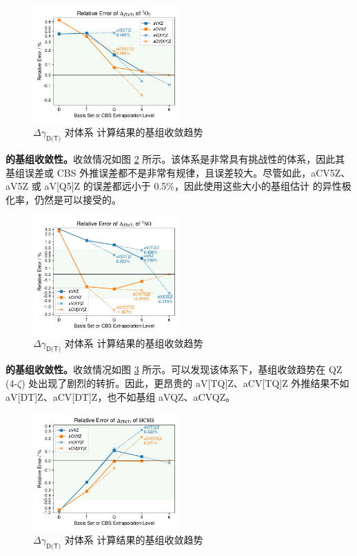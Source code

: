 \begin{figure}[ht]
    \centering
    \caption{$\Delta \gamma_\textsf{D(T)}$ 对体系  计算结果的基组收敛趋势}
    \label{fig.O2-aniso}
    \includegraphics[width=0.5\textwidth]{assets/O2-aniso.pdf}
\end{figure}

\textbf{ 的基组收敛性。}收敛情况如图 \ref{fig.SO-aniso} 所示。该体系是非常具有挑战性的体系，因此其基组误差或 CBS 外推误差都不是非常有规律，且误差较大。尽管如此，aCV5Z、aV5Z 或 aV[Q5]Z 的误差都远小于 0.5\%，因此使用这些大小的基组估计  的异性极化率，仍然是可以接受的。

\begin{figure}[ht]
    \centering
    \caption{$\Delta \gamma_\textsf{D(T)}$ 对体系  计算结果的基组收敛趋势}
    \label{fig.SO-aniso}
    \includegraphics[width=0.5\textwidth]{assets/SO-aniso.pdf}
\end{figure}

\textbf{ 的基组收敛性。}收敛情况如图 \ref{fig.HCHS-aniso} 所示。可以发现该体系下，基组收敛趋势在 QZ (4-$\zeta$) 处出现了剧烈的转折。因此，更昂贵的 aV[TQ]Z、aCV[TQ]Z 外推结果不如 aV[DT]Z、aCV[DT]Z，也不如基组 aVQZ、aCVQZ。

\begin{figure}[ht]
    \centering
    \caption{$\Delta \gamma_\textsf{D(T)}$ 对体系  计算结果的基组收敛趋势}
    \label{fig.HCHS-aniso}
    \includegraphics[width=0.5\textwidth]{assets/HCHS-aniso.pdf}
\end{figure}

